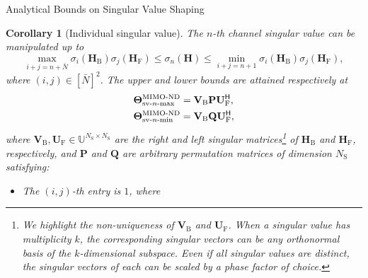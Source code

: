 \documentclass[journal]{IEEEtran}
\newtheorem{corollary}{Corollary}[proposition]
\begin{document}
\begin{section}{Analytical Bounds on Singular Value Shaping}
		\begin{corollary}[Individual singular value\label{co:sv_nth}]
			The $n$-th channel singular value can be manipulated up to
			\begin{equation}
				\max_{i+j=n+\bar{N}} \sigma_i(\mathbf{H}_\mathrm{B}) \sigma_j(\mathbf{H}_\mathrm{F}) \le \sigma_n(\mathbf{H}) \le \min_{i+j=n+1} \sigma_i(\mathbf{H}_\mathrm{B}) \sigma_j(\mathbf{H}_\mathrm{F}),
				\label{iq:sv_nth}
			\end{equation}
			where $(i, j) \in [\bar{N}]^2$.
			The upper and lower bounds are attained respectively at
			\begin{subequations}
				\label{eq:sv_nth}
				\begin{align}
					\mathbf{\Theta}_{\textnormal{sv-}n\textnormal{-max}}^\textnormal{MIMO-ND} & = \mathbf{V}_\mathrm{B} \mathbf{P} \mathbf{U}_\mathrm{F}^\mathsf{H}, \label{eq:sv_nth_max} \\
					\mathbf{\Theta}_{\textnormal{sv-}n\textnormal{-min}}^\textnormal{MIMO-ND} & = \mathbf{V}_\mathrm{B} \mathbf{Q} \mathbf{U}_\mathrm{F}^\mathsf{H}, \label{eq:sv_nth_min}
				\end{align}
			\end{subequations}
			where $\mathbf{V}_\mathrm{B}, \mathbf{U}_\mathrm{F} \in \mathbb{U}^{N_\mathrm{S} \times N_\mathrm{S}}$ are the right and left singular matrices\footnote{We highlight the non-uniqueness of $\mathbf{V}_\mathrm{B}$ and $\mathbf{U}_\mathrm{F}$. When a singular value has multiplicity $k$, the corresponding singular vectors can be any orthonormal basis of the $k$-dimensional subspace. Even if all singular values are distinct, the singular vectors of each can be scaled by a phase factor of choice.} of $\mathbf{H}_\mathrm{B}$ and $\mathbf{H}_\mathrm{F}$, respectively,
			and $\mathbf{P}$ and $\mathbf{Q}$ are arbitrary permutation matrices of dimension $N_\mathrm{S}$ satisfying:
			\begin{itemize}
				\item The $(i, j)$-th entry is $1$, where

\end{itemize}
\end{corollary}
\end{section}
\end{document}
